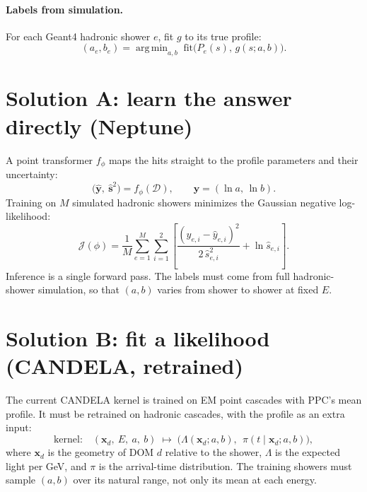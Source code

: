 \documentclass[11pt]{article}
\newcommand{\D}{\mathcal{D}}
\DeclareMathOperator*{\argmin}{arg\,min}
\begin{document}
\paragraph{Labels from simulation.}
For each Geant4 hadronic shower $e$, fit $g$ to its true profile:
\begin{equation}
  (a_e, b_e) = \argmin_{a,b}\; \text{fit}\big(P_e(s),\, g(s;a,b)\big).
\end{equation}

\section{Solution A: learn the answer directly (Neptune)}

A point transformer $f_\phi$ maps the hits straight to the profile parameters and their uncertainty:
\begin{equation}
  \big(\hat{\bm{y}},\ \hat{\bm{s}}^{2}\big) = f_\phi(\D), \qquad \bm{y} = (\ln a,\, \ln b).
\end{equation}
Training on $M$ simulated hadronic showers minimizes the Gaussian negative log-likelihood:
\begin{equation}
  \mathcal{J}(\phi) = \frac{1}{M}\sum_{e=1}^{M}\sum_{i=1}^{2}
  \left[ \frac{(y_{e,i} - \hat y_{e,i})^2}{2\,\hat s_{e,i}^{2}} + \ln \hat s_{e,i} \right].
\end{equation}
Inference is a single forward pass. The labels must come from full hadronic-shower
simulation, so that $(a,b)$ varies from shower to shower at fixed $E$.

\section{Solution B: fit a likelihood (CANDELA, retrained)}

The current CANDELA kernel is trained on EM point cascades with PPC's mean profile.
It must be retrained on hadronic cascades, with the profile as an extra input:
\begin{equation}
  \text{kernel:}\quad (\bm{x}_d,\ E,\ a,\ b) \;\longmapsto\;
  \Big( \Lambda(\bm{x}_d; a,b),\ \ \pi(t \mid \bm{x}_d; a,b) \Big),
\end{equation}
where $\bm{x}_d$ is the geometry of DOM $d$ relative to the shower, $\Lambda$ is the expected
light per GeV, and $\pi$ is the arrival-time distribution. The training showers must sample
$(a,b)$ over its natural range, not only its mean at each energy.
\end{document}
